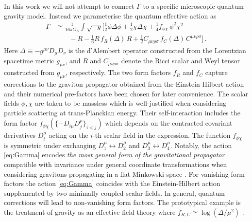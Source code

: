 \documentclass[aps,prl,reprint,twocolumn,superscriptaddress,longbibliography,nofootinbib,floatfix,showpacs]{revtex4-1}
\begin{document}
In this work we will not attempt to connect $\Gamma$ to a specific microscopic quantum gravity model.
Instead we parameterise the quantum effective action as
%
\begin{equation}\label{eq:Gamma}
\begin{aligned}
 \Gamma &\simeq \frac{1}{16\pi G_N} \int \sqrt{-g} \bigg[ \frac{1}{2} \phi \Delta \phi + \frac{1}{2} \chi \Delta \chi	+ \frac{1}{4} f_{\phi\chi} \, \phi^2 \chi^2 \\
 & \qquad - R - \frac{1}{6} R \, f_R(\Delta) \, R + \frac{1}{2} C_{\mu\nu\rho\sigma} \, f_{C}(\Delta) \, C^{\mu\nu\rho\sigma} \bigg] \, .
\end{aligned}
\end{equation}
%
Here  $\Delta \equiv - g^{\mu\nu} D_\mu D_\nu$ is the d'Alembert operator constructed from the Lorentzian spacetime metric $g_{\mu\nu}$, and $R$ and $C_{\mu\nu\rho\sigma}$ denote the Ricci scalar and Weyl tensor constructed from $g_{\mu\nu}$, respectively.
The two form factors $f_{R}$ and $f_{C}$ capture corrections to the graviton propagator obtained from the Einstein-Hilbert action and their numerical pre-factors have been chosen for later convenience.
The scalar fields $\phi,\chi$ are taken to be massless which is well-justified when considering particle scattering at trans-Planckian energy.
Their self-interaction includes the form factor $f_{\phi\chi}(\{-D_{i\mu} D_j^\mu \}_{i<j})$ which depends on the contracted covariant derivatives $D_i^\mu$ acting on the $i$-th scalar field in the expression.
The function $f_{\phi\chi}$ is symmetric under exchanging $D_1^\mu \leftrightarrow D_2^\mu$ and $D_3^\mu \leftrightarrow D_4^\mu$.
Notably, the action \eqref{eq:Gamma} encodes \emph{the most general form of the gravitational propagator} compatible with invariance under general coordinate transformations when considering gravitons propagating in a flat Minkowski space \cite{Barvinsky:1990up}.
For vanishing form factors the action \eqref{eq:Gamma} coincides with the Einstein-Hilbert action supplemented by two minimally coupled scalar fields.
In general, quantum corrections will lead to non-vanishing form factors.
The prototypical example is the treatment of gravity as an effective field theory where $f_{R,C} \simeq \log(\Delta/\mu^2)$ \cite{'tHooft:1974bx, Donoghue:1993eb, Donoghue:1994dn}.
\end{document}
